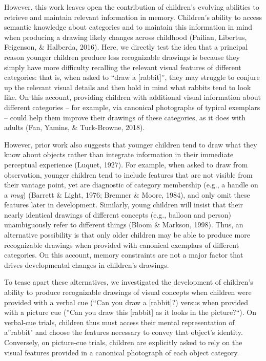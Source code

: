 \documentclass[
  english,
  man]{apa6}
\begin{document}
However, this work leaves open the contribution of children's evolving abilities to retrieve and maintain relevant information in memory. Children's ability to access semantic knowledge about categories and to maintain this information in mind when producing a drawing likely changes across childhood (Pailian, Libertus, Feigenson, \& Halberda, 2016). Here, we directly test the idea that a principal reason younger children produce less recognizable drawings is because they simply have more difficulty recalling the relevant visual features of different categories: that is, when asked to \enquote{draw a {[}rabbit{]}}, they may struggle to conjure up the relevant visual details and then hold in mind what rabbits tend to look like. On this account, providing children with additional visual information about different categories -- for example, via canonical photographs of typical exemplars -- could help them improve their drawings of these categories, as it does with adults (Fan, Yamins, \& Turk-Browne, 2018).

However, prior work also suggests that younger children tend to draw what they know about objects rather than integrate information in their immediate perceptual experience (Luquet, 1927). For example, when asked to draw from observation, younger children tend to include features that are not visible from their vantage point, yet are diagnostic of category membership (e.g., a handle on a \textit{mug}) (Barrett \& Light, 1976; Bremner \& Moore, 1984), and only omit these features later in development. Similarly, young children will insist that their nearly identical drawings of different concepts (e.g., balloon and person) unambiguously refer to different things (Bloom \& Markson, 1998).
Thus, an alternative possibility is that only older children may be able to produce more recognizable drawings when provided with canonical exemplars of different categories.
On this account, memory constraints are not a major factor that drives developmental changes in children's drawings.

To tease apart these alternatives, we investigated the development of children's ability to produce recognizable drawings of visual concepts when children were provided with a verbal cue (\enquote{Can you draw a {[}rabbit{]}?) versus when provided with a picture cue (}Can you draw this {[}rabbit{]} as it looks in the picture?\enquote{). On verbal-cue trials, children thus must access their mental representation of a}rabbit" and choose the features necessary to convey that object's identity. Conversely, on picture-cue trials, children are explicitly asked to rely on the visual features provided in a canonical photograph of each object category.
\end{document}
